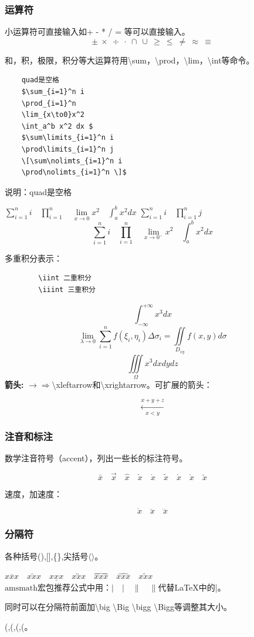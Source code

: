 \documentclass[16pt]{article}
\begin{document}
\subsubsection{运算符}
小运算符可直接输入如+ - * / = 等可以直接输入。
\[\pm\ \times\ \div\ \cdot\ \cap\ \cup\ \geq\ \leq\ \neq\ \approx\ \equiv \]
\par
和，积，极限，积分等大运算符用\textbackslash sum，\textbackslash prod，\textbackslash lim，\textbackslash int等命令。

\begin{lstlisting}
    quad是空格
    $\sum_{i=1}^n i
    \prod_{i=1}^n
    \lim_{x\to0}x^2
    \int_a^b x^2 dx $
    $\sum\limits_{i=1}^n i
    \prod\limits_{i=1}^n j
    \[\sum\nolimts_{i=1}^n i
    \prod\nolimts_{i=1}^n \]$
\end{lstlisting}
说明：quad是空格 \par
$\sum_{i=1}^n i \quad
\prod_{i=1}^n   \quad
\lim\limits_{x\to0}x^2 \quad
\int_a^b x^2 dx $   
$\sum\limits_{i=1}^n i  \quad
\prod\limits_{i=1}^n j$
\[\sum\limits_{i=1}^n i \quad \prod\limits_{i=1}^n \quad \lim\limits_{x\to0^-}x^2 \quad \int_a^b x^2 dx\]
\par
多重积分表示：
    \begin{lstlisting}
        \iint 二重积分
        \iiint 三重积分
    \end{lstlisting}
    \[\int_{-\infty}^{+\infty}x^3dx\]
    \[\lim_{\lambda \to 0}\sum\limits_{i=1}^n f(\xi _i,\eta _i)\Delta \sigma _i=\iint\limits_{D_{xy}} f(x,y)d\sigma \]
    \[\iiint\limits_{\Omega }x^3 dxdydz\]
\textbf{箭头:}
    $ \rightarrow \Longrightarrow $\textbackslash xleftarrow和\textbackslash xrightarrow。可扩展的箭头：\par
    \[\xleftarrow[x<y]{x+y+z}\]

\subsubsection{注音和标注}
数学注音符号（accent），列出一些长的标注符号。\par
\[\bar{x} \quad \vec{x} \quad \hat{x} \quad \check{x} \quad \mathring{x} \quad \tilde{x} \quad \acute{x} \quad \grave{x} \quad \breve{x}\] \par
速度，加速度：\par
\[\dot{x} \quad \ddot{x} \quad \dddot{x}\]
\subsubsection{分隔符}
    各种括号(),[],\{\},尖括号$\langle \rangle$。 \par
    $\overline{xxx} \quad \overleftarrow{xxx} \quad \underline{xxx} \quad \overleftrightarrow{xxx} \quad \overbrace{xxx} \quad \widehat{xxx} \quad \widetilde{xxx}$
    $\textrm{amsmath宏包推荐公式中用：}\lvert \quad \rvert \quad \lVert \quad \rVert$代替\LaTeX{}中的|。 \par
    同时可以在分隔符前面加\textbackslash big \textbackslash Big \textbackslash bigg \textbackslash Bigg等调整其大小。\par
    \big(,\bigg(,\Big(,\Bigg(。
\end{document}
